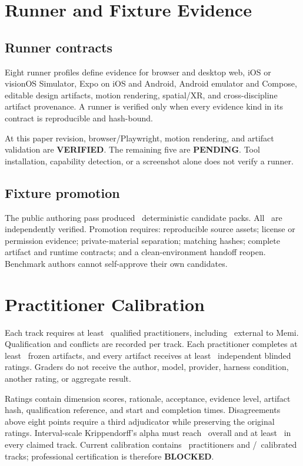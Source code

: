\documentclass[10pt,twocolumn]{article}
\newcommand{\pass}{\textcolor{MemiGreen}{\textbf{VERIFIED}}}
\newcommand{\blocked}{\textcolor{MemiRed}{\textbf{BLOCKED}}}
\newcommand{\pending}{\textcolor{MemiAmber}{\textbf{PENDING}}}
\begin{document}
\section{Runner and Fixture Evidence}

\subsection{Runner contracts}

Eight runner profiles define evidence for browser and desktop web, iOS or
visionOS Simulator, Expo on iOS and Android, Android emulator and Compose,
editable design artifacts, motion rendering, spatial/XR, and cross-discipline
artifact provenance. A runner is verified only when every evidence kind in its
contract is reproducible and hash-bound.

At this paper revision, browser/Playwright, motion rendering, and artifact
validation are \pass. The remaining five are \pending. Tool installation,
capability detection, or a screenshot alone does not verify a runner.

\subsection{Fixture promotion}

The public authoring pass produced \PreparedFixtures\ deterministic candidate
packs. All \VerifiedFixtures\ are independently verified. Promotion requires:
reproducible source assets; license or permission evidence; private-material
separation; matching hashes; complete artifact and runtime contracts; and a
clean-environment handoff reopen. Benchmark authors cannot self-approve their
own candidates.

\section{Practitioner Calibration}

Each track requires at least \MinimumPractitioners\ qualified practitioners,
including \MinimumExternalPractitioners\ external to Memi. Qualification and
conflicts are recorded per track. Each practitioner completes at least
\ArtifactsPerPractitioner\ frozen artifacts, and every artifact receives at
least \RatingsPerArtifact\ independent blinded ratings. Graders do not receive
the author, model, provider, harness condition, another rating, or aggregate
result.

Ratings contain dimension scores, rationale, acceptance, evidence level,
artifact hash, qualification reference, and start and completion times.
Disagreements above eight points require a third adjudicator while preserving
the original ratings. Interval-scale Krippendorff's alpha
\cite{hughes2021alpha} must reach \OverallAlpha\ overall and at least
\TrackAlpha\ in every claimed track. Current calibration contains
\Practitioners\ practitioners and \CalibratedTracks/\BenchmarkTracks\
calibrated tracks; professional certification is therefore \blocked.
\end{document}
